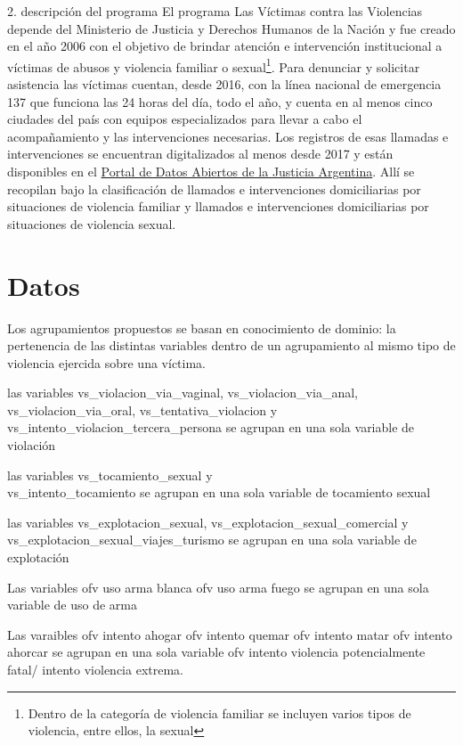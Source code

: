\documentclass[10pt, spanish]{article}
\begin{document}
2. descripción del programa
El programa Las Víctimas contra las Violencias depende del Ministerio de Justicia y Derechos Humanos de la Nación y fue creado en el año 2006 con el objetivo de brindar atención e intervención institucional a víctimas de abusos y violencia familiar o sexual\footnote{Dentro de la categoría de violencia familiar se incluyen varios tipos de violencia, entre ellos, la sexual}. Para denunciar  y solicitar asistencia las víctimas cuentan, desde 2016, con la línea nacional de emergencia 137 que funciona las 24 horas del día, todo el año, y cuenta en al menos cinco ciudades del país con equipos especializados para llevar a cabo el acompañamiento y las intervenciones necesarias. Los registros de esas llamadas e intervenciones se encuentran digitalizados al menos desde 2017 y están disponibles en el \href{http://datos.jus.gob.ar/}{Portal de Datos Abiertos de la Justicia Argentina}. Allí se recopilan bajo la clasificación de llamados e intervenciones domiciliarias por situaciones de violencia familiar y llamados e intervenciones domiciliarias por situaciones de violencia sexual. 


\section{Datos}\label{datos}




Los agrupamientos propuestos se basan en conocimiento de dominio: la pertenencia de las distintas variables dentro de un agrupamiento al mismo tipo de violencia ejercida sobre una víctima.




las variables vs\_violacion\_via\_vaginal,  vs\_violacion\_via\_anal,  vs\_violacion\_via\_oral, vs\_tentativa\_violacion y vs\_intento\_violacion\_tercera\_persona se agrupan en una sola variable de violación

las variables vs\_tocamiento\_sexual y \\ vs\_intento\_tocamiento se agrupan en una sola variable de tocamiento sexual



las variables vs\_explotacion\_sexual,  vs\_explotacion\_sexual\_comercial y vs\_explotacion\_sexual\_viajes\_turismo se agrupan en una sola variable de explotación


Las variables ofv uso arma blanca ofv uso arma fuego se agrupan en una sola variable de uso de arma

Las varaibles ofv intento ahogar ofv intento quemar 
ofv intento matar ofv intento ahorcar se agrupan en una sola variable ofv intento violencia potencialmente fatal/ intento violencia extrema.
\end{document}
